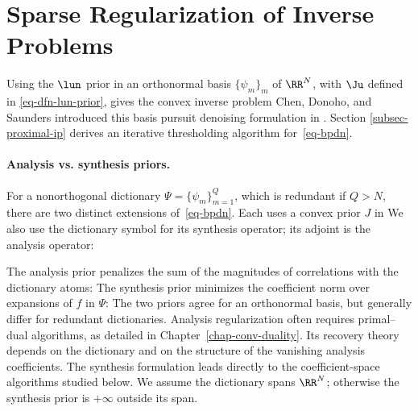 \section{Sparse Regularization of Inverse Problems}
\label{sec-sparse-ip}

Using the $\lun$ prior in an orthonormal basis $\{\psi_m\}_m$ of $\RR^N$, with $\Ju$ defined in \eqref{eq-dfn-lun-prior}, gives the convex inverse problem
Chen, Donoho, and Saunders introduced this basis pursuit denoising formulation in \cite{chen-basis-pursuit}. Section \ref{subsec-proximal-ip} derives an iterative thresholding algorithm for~\eqref{eq-bpdn}.

   
\paragraph{Analysis vs. synthesis priors.}

For a nonorthogonal dictionary $\Psi=\{\psi_m\}_{m=1}^Q$, which is redundant if $Q>N$, there are two distinct extensions of~\eqref{eq-bpdn}. Each uses a convex prior $J$ in
We also use the dictionary symbol for its synthesis operator; its adjoint is the analysis operator:

The analysis prior penalizes the sum of the magnitudes of correlations with the dictionary atoms:
The synthesis prior minimizes the coefficient norm over expansions of $f$ in $\Psi$:
The two priors agree for an orthonormal basis, but generally differ for redundant dictionaries. Analysis regularization often requires primal--dual algorithms, as detailed in Chapter~\ref{chap-conv-duality}. Its recovery theory depends on the dictionary and on the structure of the vanishing analysis coefficients. The synthesis formulation leads directly to the coefficient-space algorithms studied below. We assume the dictionary spans $\RR^N$; otherwise the synthesis prior is $+\infty$ outside its span.


